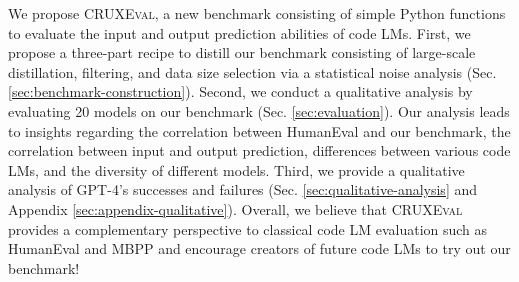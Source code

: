 \documentclass[twoside,11pt,preprint]{article}
\newcommand{\benchmark}{\textsc{CRUXEval}\xspace}
\begin{document}
We propose \benchmark, a new benchmark consisting of simple Python functions to evaluate the input and output prediction abilities of code LMs. First, we propose a three-part recipe to distill our benchmark consisting of large-scale distillation, filtering, and data size selection via a statistical noise analysis (Sec. \ref{sec:benchmark-construction}). Second, we conduct a qualitative analysis by evaluating 20 models on our benchmark (Sec. \ref{sec:evaluation}). Our analysis leads to insights regarding the correlation between HumanEval and our benchmark, the correlation between input and output prediction, differences between various code LMs, and the diversity of different models. Third, we provide a qualitative analysis of GPT-4's successes and failures (Sec. \ref{sec:qualitative-analysis} and Appendix \ref{sec:appendix-qualitative}). Overall, we believe that \benchmark provides a complementary perspective to classical code LM evaluation such as HumanEval and MBPP and encourage creators of future code LMs to try out our benchmark!


% 


\newpage
\appendix
\onecolumn






\end{document}

